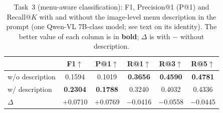 \begin{table}[tb]
  \centering
  \caption{Task~3 (menu-aware classification): F1, Precision@1 (P@1) and Recall@$K$ with and without the image-level menu description in the prompt (one Qwen-VL 7B-class model; see text on its identity). The better value of each column is in \textbf{bold}; $\Delta$ is with $-$ without description.}
  \small
  \setlength{\tabcolsep}{3pt}
  \begin{tabular}{@{}lccccc@{}}
      \toprule
                      & \textbf{F1}$\uparrow$ & \textbf{P@1}$\uparrow$ & \textbf{R@1}$\uparrow$ & \textbf{R@3}$\uparrow$ & \textbf{R@5}$\uparrow$ \\
      \midrule
      w/o description & 0.1594          & 0.1019          & \textbf{0.3656} & \textbf{0.4590} & \textbf{0.4781} \\
      w/ description  & \textbf{0.2304} & \textbf{0.1788} & 0.3240          & 0.4032          & 0.4336          \\
      \midrule
      $\Delta$        & $+$0.0710       & $+$0.0769       & $-$0.0416       & $-$0.0558       & $-$0.0445       \\
      \bottomrule
    \end{tabular}\label{table:desc_guided}
\end{table}
